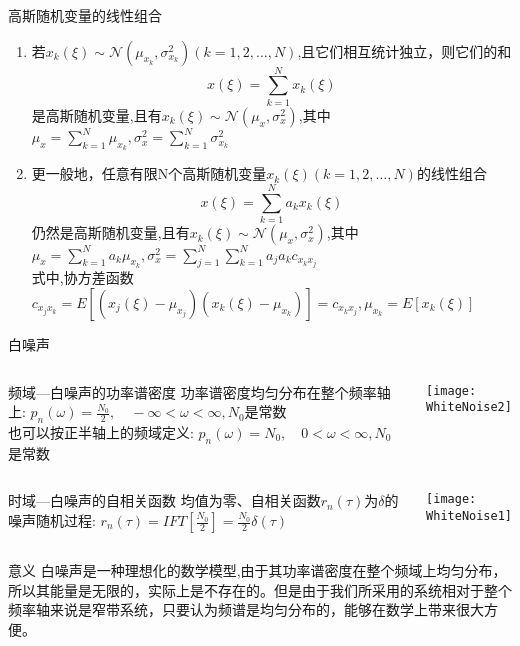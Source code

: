 \begin{frame}{高斯随机变量的线性组合}
\begin{enumerate}
	\item 若$x_k(\xi)\sim\mathcal{N}(\mu_{x_k},\sigma_{x_k}^2)(k=1,2,\dots,N)$,且它们相互统计独立，则它们的和
	\[x(\xi)=\sum\limits_{k=1}^{N}x_k(\xi) \]
	是高斯随机变量,且有$x_k(\xi)\sim\mathcal{N}(\mu_x,\sigma_x^2)$,其中
	$\mu_x=\sum\limits_{k=1}^N\mu_{x_k},\sigma_x^2=\sum\limits_{k=1}^N\sigma_{x_k}^2$
	\item 更一般地，任意有限N个高斯随机变量$x_k(\xi)(k=1,2,\dots,N)$的线性组合
	\[x(\xi)=\sum\limits_{k=1}^{N}a_kx_k(\xi) \]
	仍然是高斯随机变量,且有$x_k(\xi)\sim\mathcal{N}(\mu_x,\sigma_x^2)$,其中
	$\mu_x=\sum\limits_{k=1}^Na_k\mu_{x_k},\sigma_x^2=\sum\limits_{j=1}^N\sum\limits_{k=1}^Na_ja_kc_{x_kx_j}$\\
	式中,协方差函数$c_{x_jx_k}=E[(x_j(\xi)-\mu_{x_j})(x_k(\xi)-\mu_{x_k})]=c_{x_kx_j},\mu_{x_k}=E[x_k(\xi)]$
\end{enumerate}
\end{frame}

\begin{frame}{白噪声}
\small
\begin{columns}%
	\begin{block}{频域---白噪声的功率谱密度}
	功率谱密度均匀分布在整个频率轴上: $p_n(\omega)=\frac{N_0}{2},\quad -\infty<\omega< \infty, N_0$是常数\\
	也可以按正半轴上的频域定义: $p_n(\omega)=N_0,\quad 0<\omega<\infty, N_0$是常数
	\end{block}
    \texttt{[image: WhiteNoise2]}
\end{columns}

\begin{columns}%
	\begin{block}{时域---白噪声的自相关函数}
	均值为零、自相关函数$r_n(\tau)$为$\delta$的噪声随机过程: $r_n(\tau)=IFT[\frac{N_0}{2}]=\frac{N_0}{2}\delta(\tau)$
	\end{block}
	\texttt{[image: WhiteNoise1]}
\end{columns}
\begin{block}{意义}
	白噪声是一种理想化的数学模型,由于其功率谱密度在整个频域上均匀分布，所以其能量是无限的，实际上是不存在的。但是由于我们所采用的系统相对于整个频率轴来说是窄带系统，只要认为频谱是均匀分布的，能够在数学上带来很大方便。
\end{block}
\end{frame}

